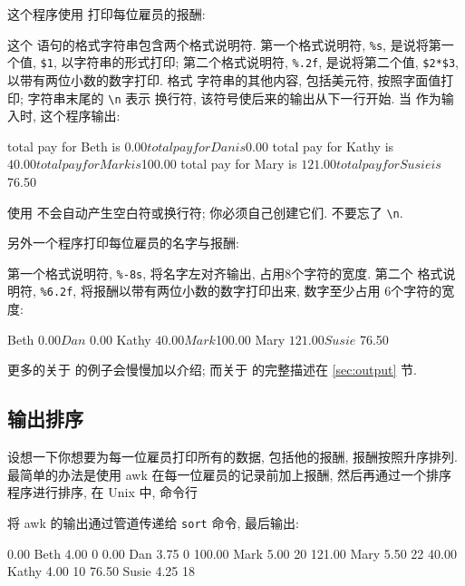 这个程序使用 \printf 打印每位雇员的报酬:
这个 \printf 语句的格式字符串包含两个格式说明符. 第一个格式说明符,
\verb'%s', 是说将第一个值, \verb'$1', 以字符串的形式打印; 第二个格式说明符,
\verb'%.2f', 是说将第二个值, \verb'$2*$3', 以带有两位小数的数字打印. 格式
字符串的其他内容, 包括美元符, 按照字面值打印; 字符串末尾的 \verb'\n' 表示
换行符, 该符号使后来的输出从下一行开始. 当  作为输入时,
这个程序输出:
\begin{file}
    total pay for Beth is $0.00
    total pay for Dan is $0.00
    total pay for Kathy is $40.00
    total pay for Mark is $100.00
    total pay for Mary is $121.00
    total pay for Susie is $76.50
\end{file}
使用 \printf 不会自动产生空白符或换行符; 你必须自己创建它们. 不要忘了
\verb'\n'.

另外一个程序打印每位雇员的名字与报酬:
第一个格式说明符, \verb'%-8s', 将名字左对齐输出, 占用8个字符的宽度. 第二个
格式说明符, \verb'%6.2f', 将报酬以带有两位小数的数字打印出来, 数字至少占用
6个字符的宽度:
\begin{awkcode}
    Beth     $  0.00
    Dan      $  0.00
    Kathy    $ 40.00
    Mark     $100.00
    Mary     $121.00
    Susie    $ 76.50
\end{awkcode}
更多的关于 \printf 的例子会慢慢加以介绍; 而关于 \printf 的完整描述在
\ref{sec:output} 节.

\subsection{输出排序}
\label{subsec:sorting_the_output}

设想一下你想要为每一位雇员打印所有的数据, 包括他的报酬, 报酬按照升序排列.
最简单的办法是使用 awk 在每一位雇员的记录前加上报酬, 然后再通过一个排序
程序进行排序, 在 Unix 中, 命令行
将 awk 的输出通过管道传递给 \texttt{sort} 命令, 最后输出:
\begin{file}
      0.00 Beth    4.00    0
      0.00 Dan     3.75    0
    100.00 Mark    5.00    20
    121.00 Mary    5.50    22
     40.00 Kathy   4.00    10
     76.50 Susie   4.25    18
\end{file}

